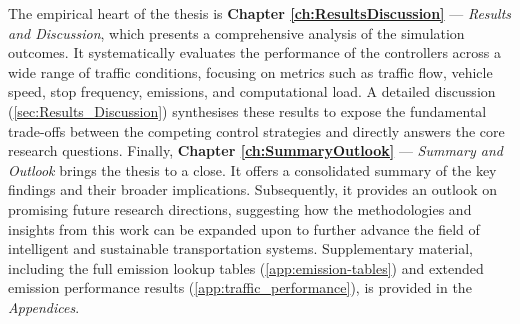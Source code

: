 \mynewline
The empirical heart of the thesis is \textbf{Chapter \ref{ch:ResultsDiscussion}} --- \textit{Results and Discussion}, which presents a comprehensive analysis of the simulation outcomes. It systematically evaluates the performance of the controllers across a wide range of traffic conditions, focusing on metrics such as traffic flow, vehicle speed, stop frequency, emissions, and computational load. A detailed discussion (\vref{sec:Results_Discussion}) synthesises these results to expose the fundamental trade-offs between the competing control strategies and directly answers the core research questions.
\mynewline
Finally, \textbf{Chapter \ref{ch:SummaryOutlook}} --- \textit{Summary and Outlook} brings the thesis to a close. It offers a consolidated summary of the key findings and their broader implications. Subsequently, it provides an outlook on promising future research directions, suggesting how the methodologies and insights from this work can be expanded upon to further advance the field of intelligent and sustainable transportation systems.
\mynewline
Supplementary material, including the full emission lookup tables (\vref{app:emission-tables}) and extended emission performance results (\vref{app:traffic_performance}), is provided in the \textit{Appendices}.